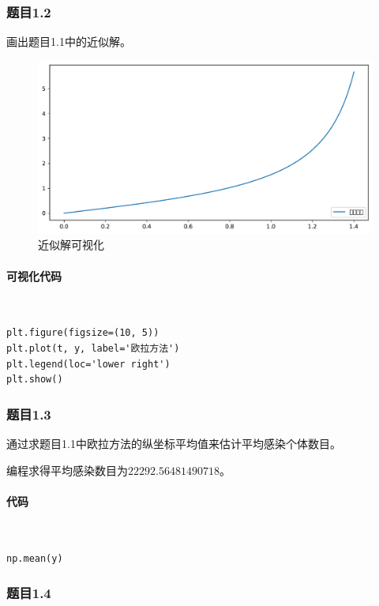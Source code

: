 \subsubsection{题目1.2}

画出题目1.1中的近似解。

\begin{figure}[H]
	\centering
	\caption{近似解可视化}
	\includegraphics[width=\linewidth]{fig29.pdf}
\end{figure}

\paragraph{可视化代码}
~\\
\begin{verbatim}
plt.figure(figsize=(10, 5))
plt.plot(t, y, label='欧拉方法')
plt.legend(loc='lower right')
plt.show()
\end{verbatim}

\subsubsection{题目1.3}

通过求题目1.1中欧拉方法的纵坐标平均值来估计平均感染个体数目。

编程求得平均感染数目为$22292.56481490718$。

\paragraph{代码}
~\\
\begin{verbatim}
np.mean(y)
\end{verbatim}

\subsubsection{题目1.4}

